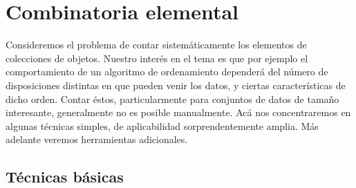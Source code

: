 %

\chapter{Combinatoria elemental}
\label{cha:combinatoria-elemental}

  Consideremos el problema de contar sistemáticamente
  los elementos de colecciones de objetos.
  Nuestro interés en el tema es que por ejemplo
  el comportamiento de un algoritmo de ordenamiento
  dependerá del número de disposiciones distintas
  en que pueden venir los datos,
  y ciertas características de dicho orden.
  Contar éstos,
  particularmente para conjuntos de datos de tamaño interesante,
  generalmente no es posible manualmente.
  Acá nos concentraremos en algunas técnicas simples,
  de aplicabilidad sorprendentemente amplia.
  Más adelante veremos herramientas adicionales.

\section{Técnicas básicas}
\label{sec:tecnicas-basicas-conteo}

